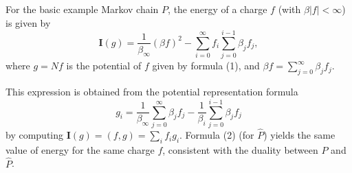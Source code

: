 For the basic example Markov chain $P$, the energy of a charge $f$ (with $\beta|f| < \infty$) is given by
$$\mathbf{I}(g) = \frac{1}{\beta_\infty} (\beta f)^2 - \sum_{i=0}^{\infty} f_i \sum_{j=0}^{i-1} \beta_j f_j,$$
where $g = Nf$ is the potential of $f$ given by formula (1), and $\beta f = \sum_{j=0}^{\infty} \beta_j f_j$.

This expression is obtained from the potential representation formula
$$g_i = \frac{1}{\beta_\infty} \sum_{j=0}^{\infty} \beta_j f_j - \frac{1}{\beta_i} \sum_{j=0}^{i-1} \beta_j f_j$$
by computing $\mathbf{I}(g) = (f, g) = \sum_i f_i g_i$. Formula (2) (for $\hat{P}$) yields the same value of energy for the same charge $f$, consistent with the duality between $P$ and $\hat{P}$.
